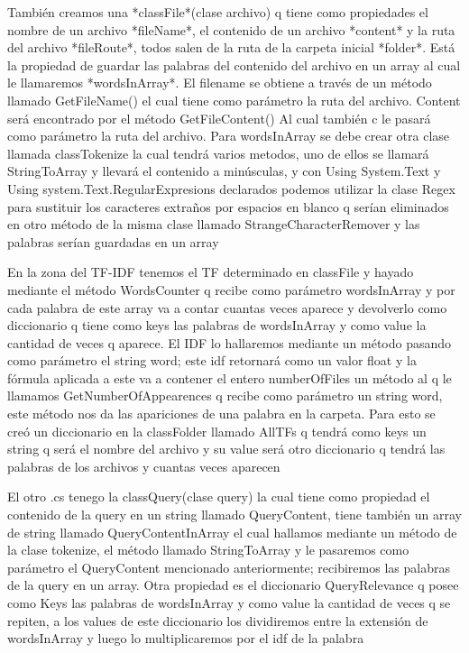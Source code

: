 \documentclass[a4paper,12pt]{article}
\begin{document}
También creamos una *classFile*(clase archivo) q tiene   como propiedades el nombre de un archivo *fileName*, el contenido de un archivo *content* y la ruta del archivo *fileRoute*, todos salen de la ruta de la carpeta inicial *folder*. Está la propiedad de guardar las palabras del contenido del archivo en un array al cual le llamaremos *wordsInArray*. El filename se obtiene a través de un método llamado GetFileName() el cual tiene como parámetro la ruta del archivo. Content será encontrado por el método GetFileContent() Al cual también c le pasará como parámetro la ruta del archivo. Para wordsInArray se debe crear otra clase llamada classTokenize la cual tendrá varios metodos, uno de ellos se llamará StringToArray y llevará el contenido a minúsculas, y con Using System.Text y Using system.Text.RegularExpresions declarados podemos utilizar la clase Regex para sustituir los caracteres extraños por espacios en blanco q serían eliminados en otro método de la misma clase llamado StrangeCharacterRemover y las palabras serían guardadas en un array

En la zona del TF-IDF tenemos el TF determinado en classFile y hayado mediante el método WordsCounter q recibe como parámetro wordsInArray y por cada palabra de este array va a contar cuantas veces aparece y devolverlo como diccionario q tiene como keys las palabras de wordsInArray y como value la cantidad de veces q aparece. El IDF  lo hallaremos mediante un método pasando como parámetro el string word; este idf retornará como un valor float y la fórmula aplicada a este va a contener el entero numberOfFiles un método al q le llamamos GetNumberOfAppearences q recibe como parámetro un string word, este método nos da las apariciones de una palabra en la carpeta. Para esto se creó un diccionario en la classFolder llamado AllTFs q tendrá como keys un string q será el nombre del archivo y su value será otro diccionario q tendrá las palabras de los archivos y cuantas veces aparecen

El otro .cs tenego la classQuery(clase query) la cual tiene como propiedad el contenido de la query en un string llamado QueryContent, tiene también un array de string llamado QueryContentInArray el cual hallamos mediante un método de la clase tokenize, el método llamado StringToArray y le pasaremos como parámetro el QueryContent mencionado anteriormente; recibiremos las palabras de la query en un array. Otra propiedad es el diccionario QueryRelevance q posee como Keys las palabras de wordsInArray y como value la cantidad de veces q se repiten, a los values de este diccionario los dividiremos entre la extensión de wordsInArray y luego lo multiplicaremos por el idf de la palabra
\end{document}

